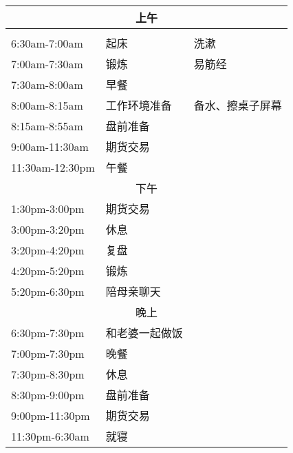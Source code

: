 \documentclass{article}[40pt]
\newcommand{\hei}{\CJKfamily{hei}}
\begin{document}
\thispagestyle{empty}
\begin{center}
    \hei {\Huge 作息时间表}
\end{center}
\hfill

\begin{table}[!hbt]
\centering
\large\selectfont
\begin{tabular}{|l|l|l|}\hline
\multicolumn{3}{|c|}{上午}\\
\hline
\hei{时间}& \hei{安排} & \hei{备注}\\
\hline
6:30am-7:00am&	起床&	洗漱\\
\hline
7:00am-7:30am&	锻炼&	易筋经\\
\hline
7:30am-8:00am&	早餐&\\
\hline
8:00am-8:15am&	工作环境准备&	备水、擦桌子屏幕\\
\hline
8:15am-8:55am&	盘前准备&\\
\hline
9:00am-11:30am&	期货交易&\\
\hline
11:30am-12:30pm&	午餐&\\
\hline
\multicolumn{3}{|c|}{下午}\\
\hline
    1:30pm-3:00pm&	期货交易&\\
\hline
    3:00pm-3:20pm&	休息&\\
\hline
    3:20pm-4:20pm&	复盘&\\
\hline
    4:20pm-5:20pm&	锻炼&\\
\hline
    5:20pm-6:30pm&	陪母亲聊天&\\
\hline

\multicolumn{3}{|c|}{晚上}\\
\hline
    6:30pm-7:30pm&	和老婆一起做饭&\\
\hline
    7:00pm-7:30pm&	晚餐&\\
\hline
    7:30pm-8:30pm&	休息&\\
\hline
    8:30pm-9:00pm&	盘前准备&\\
\hline
    9:00pm-11:30pm&	期货交易&\\
\hline
    11:30pm-6:30am&	就寝&\\
\hline
\end{tabular}
\end{table}
\end{document}
